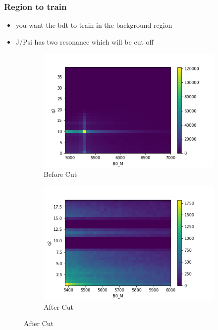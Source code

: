 \documentclass{beamer}
\begin{document}
\begin{frame}
  \frametitle{Region to train}
  \begin{itemize}
    \item you want the bdt to train in the background region
    \item J/Psi has two resonance which will be cut off
  \end{itemize}

  \begin{figure}
\centering
\begin{subfigure}{0.5\textwidth}
  \centering
  \includegraphics[width=1\linewidth]{beforeCutPlot}
  \caption{Before Cut}
\end{subfigure}%
\begin{subfigure}{0.5\textwidth}
  \centering
  \includegraphics[width=1\linewidth]{cutPlot}
  \caption{After Cut}
\end{subfigure}
\end{figure}

\end{frame}
\end{document}
